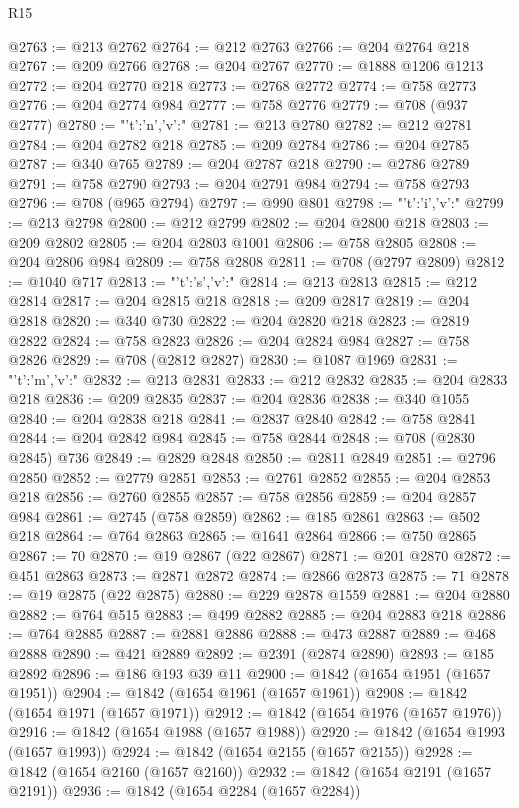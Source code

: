 \begin{lexlean}{R15}
\begin{coremodule}
{{{{{{{@2763 := @213 @2762
@2764 := @212 @2763
@2766 := @204 @2764 @218
@2767 := @209 @2766
@2768 := @204 @2767
@2770 := @1888 @1206 @1213
@2772 := @204 @2770 @218
@2773 := @2768 @2772
@2774 := @758 @2773
@2776 := @204 @2774 @984
@2777 := @758 @2776
@2779 := @708 (@937 @2777)
@2780 := "{'t':'n','v':"
@2781 := @213 @2780
@2782 := @212 @2781
@2784 := @204 @2782 @218
@2785 := @209 @2784
@2786 := @204 @2785
@2787 := @340 @765
@2789 := @204 @2787 @218
@2790 := @2786 @2789
@2791 := @758 @2790
@2793 := @204 @2791 @984
@2794 := @758 @2793
@2796 := @708 (@965 @2794)
@2797 := @990 @801
@2798 := "{'t':'i','v':"
@2799 := @213 @2798
@2800 := @212 @2799
@2802 := @204 @2800 @218
@2803 := @209 @2802
@2805 := @204 @2803 @1001
@2806 := @758 @2805
@2808 := @204 @2806 @984
@2809 := @758 @2808
@2811 := @708 (@2797 @2809)
@2812 := @1040 @717
@2813 := "{'t':'s','v':"
@2814 := @213 @2813
@2815 := @212 @2814
@2817 := @204 @2815 @218
@2818 := @209 @2817
@2819 := @204 @2818
@2820 := @340 @730
@2822 := @204 @2820 @218
@2823 := @2819 @2822
@2824 := @758 @2823
@2826 := @204 @2824 @984
@2827 := @758 @2826
@2829 := @708 (@2812 @2827)
@2830 := @1087 @1969
@2831 := "{'t':'m','v':"
@2832 := @213 @2831
@2833 := @212 @2832
@2835 := @204 @2833 @218
@2836 := @209 @2835
@2837 := @204 @2836
@2838 := @340 @1055
@2840 := @204 @2838 @218
@2841 := @2837 @2840
@2842 := @758 @2841
@2844 := @204 @2842 @984
@2845 := @758 @2844
@2848 := @708 (@2830 @2845) @736
@2849 := @2829 @2848
@2850 := @2811 @2849
@2851 := @2796 @2850
@2852 := @2779 @2851
@2853 := @2761 @2852
@2855 := @204 @2853 @218
@2856 := @2760 @2855
@2857 := @758 @2856
@2859 := @204 @2857 @984
@2861 := @2745 (@758 @2859)
@2862 := @185 @2861
@2863 := @502 @218
@2864 := @764 @2863
@2865 := @1641 @2864
@2866 := @750 @2865
@2867 := 70
@2870 := @19 @2867 (@22 @2867)
@2871 := @201 @2870
@2872 := @451 @2863
@2873 := @2871 @2872
@2874 := @2866 @2873
@2875 := 71
@2878 := @19 @2875 (@22 @2875)
@2880 := @229 @2878 @1559
@2881 := @204 @2880
@2882 := @764 @515
@2883 := @499 @2882
@2885 := @204 @2883 @218
@2886 := @764 @2885
@2887 := @2881 @2886
@2888 := @473 @2887
@2889 := @468 @2888
@2890 := @421 @2889
@2892 := @2391 (@2874 @2890)
@2893 := @185 @2892
@2896 := @186 @193 @39 @11
@2900 := @1842 (@1654 @1951 (@1657 @1951))
@2904 := @1842 (@1654 @1961 (@1657 @1961))
@2908 := @1842 (@1654 @1971 (@1657 @1971))
@2912 := @1842 (@1654 @1976 (@1657 @1976))
@2916 := @1842 (@1654 @1988 (@1657 @1988))
@2920 := @1842 (@1654 @1993 (@1657 @1993))
@2924 := @1842 (@1654 @2155 (@1657 @2155))
@2928 := @1842 (@1654 @2160 (@1657 @2160))
@2932 := @1842 (@1654 @2191 (@1657 @2191))
@2936 := @1842 (@1654 @2284 (@1657 @2284))
}}}}}}}}}}}
\end{coremodule}
\end{lexlean}
